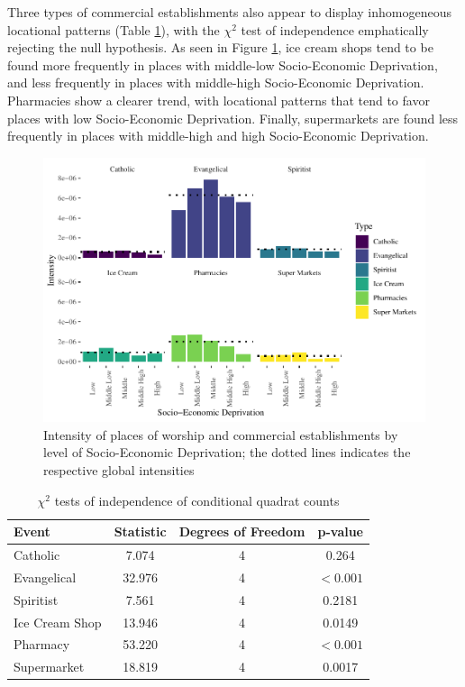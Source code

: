 \documentclass[smallextended]{svjour3}       %
\begin{document}
Three types of commercial establishments also appear to display
inhomogeneous locational patterns (Table
\ref{tab:quadrat-test-statistics}), with the \(\chi^2\) test of
independence emphatically rejecting the null hypothesis. As seen in
Figure \ref{fig:plot-events-quadrat}, ice cream shops tend to be found
more frequently in places with middle-low Socio-Economic Deprivation,
and less frequently in places with middle-high Socio-Economic
Deprivation. Pharmacies show a clearer trend, with locational patterns
that tend to favor places with low Socio-Economic Deprivation. Finally,
supermarkets are found less frequently in places with middle-high and
high Socio-Economic Deprivation.

\begin{figure}
\centering
\includegraphics{Moral_Communities_and_Crime_files/figure-latex/plot-events-quadrat-1.pdf}
\caption{\label{fig:plot-events-quadrat}Intensity of places of worship
and commercial establishments by level of Socio-Economic Deprivation;
the dotted lines indicates the respective global intensities}
\end{figure}

\begin{table}

\caption{\label{tab:table-quadrat-test-statistics}\label{tab:quadrat-test-statistics}$\chi^2$ tests of independence of conditional quadrat counts}
\centering
\begin{tabular}[t]{lccc}
\toprule
Event & Statistic & Degrees of Freedom & p-value\\
\midrule
Catholic & 7.074 & 4 & 0.264\\
Evangelical & 32.976 & 4 & $<0.001$\\
Spiritist & 7.561 & 4 & 0.2181\\
Ice Cream Shop & 13.946 & 4 & 0.0149\\
Pharmacy & 53.220 & 4 & $<0.001$\\
\addlinespace
Supermarket & 18.819 & 4 & 0.0017\\
\bottomrule
\end{tabular}
\end{table}
\end{document}
